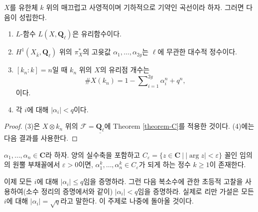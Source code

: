 \begin{lemma}
\label{lemma-count-points-projective}
$X$를 유한체 $k$ 위의 매끄럽고 사영적이며 기하적으로 기약인 곡선이라 하자.
그러면 다음이 성립한다.
\begin{enumerate}
\item $L$-함수 $L(X, \mathbf{Q}_\ell)$은 유리함수이다.
\item $H^1(X_{\bar k}, \mathbf{Q}_\ell)$ 위의 $\pi_X^*$의 고윳값
$\alpha_1, \ldots, \alpha_{2g}$는 $\ell$에 무관한 대수적 정수이다.
\item $[k_n : k] = n$일 때 $k_n$ 위의 $X$의 유리점 개수는
$$
\# X(k_n) = 1 - \sum\nolimits_{i = 1}^{2g}\alpha_i^n + q^n,
$$
이다.
\item 각 $i$에 대해 $|\alpha_i| < q$이다.
\end{enumerate}
\end{lemma}

\begin{proof}
(3)은 $X \otimes k_n$ 위의 $\mathcal{F} =
\underline{\mathbf{Q}_\ell}$에 Theorem \ref{theorem-C}를 적용한 것이다.
(4)에는 다음 결과를 사용한다.
\end{proof}

\begin{exercise}
\label{exercise-powers}
$\alpha_1, \ldots, \alpha_n \in \mathbf{C}$라 하자. 양의 실수축을 포함하고
$C_\varepsilon = \{ z \in
\mathbf{C} \ | \ |\arg z| < \varepsilon \}$ 꼴인 임의의 원뿔 부채꼴에서
$\varepsilon > 0$이면, $\alpha_1^k, \ldots, \alpha_n^k \in
C_\varepsilon$가 되게 하는 정수 $k \geq 1$이 존재한다.
\end{exercise}

\noindent
이제 모든 $i$에 대해 $|\alpha_i| \leq q$임을 증명하라. 그런 다음
복소수에 관한 초등적 고찰을 사용하여(소수 정리의 증명에서와 같이)
$|\alpha_i| < q$임을 증명하라. 실제로 리만 가설은 모든 $i$에 대해
$|\alpha_i| = \sqrt{q}$라고 말한다. 이 주제로 나중에 돌아올 것이다.

